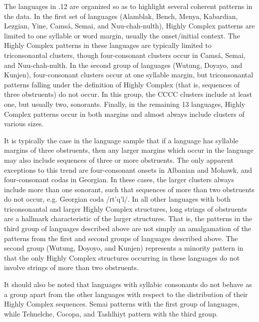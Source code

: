   The languages in .12 are organized so as to highlight several coherent patterns in the data. In the first set of languages (Alamblak, Bench, Menya, Kabardian, Lezgian, Yine, Camsá, Semai, and Nuu-chah-nulth), Highly Complex patterns are limited to one syllable or word margin, usually the onset/initial context. The Highly Complex patterns in these languages are typically limited to triconsonantal clusters, though four-consonant clusters occur in Camsá, Semai, and Nuu-chah-nulth. In the second group of languages (Wutung, Doyayo, and Kunjen), four-consonant clusters occur at one syllable margin, but triconsonantal patterns falling under the definition of Highly Complex (that is, sequences of three obstruents) do not occur. In this group, the CCCC clusters include at least one, but usually two, sonorants. Finally, in the remaining 13 languages, Highly Complex patterns occur in both margins and almost always include clusters of various sizes.



  It is typically the case in the language sample that if a language has syllable margins of three obstruents, then any larger margins which occur in the language may also include sequences of three or more obstruents. The only apparent exceptions to this trend are four-consonant onsets in Albanian and Mohawk, and four-consonant codas in Georgian. In these cases, the larger clusters always include more than one sonorant, such that sequences of more than two obstruents do not occur, e.g. Georgian coda /ɾt’q’l/. In all other languages with both triconsonantal and larger Highly Complex structures, long strings of obstruents are a hallmark characteristic of the larger structures. That is, the patterns in the third group of languages described above are not simply an amalgamation of the patterns from the first and second groups of languages described above. The second group (Wutung, Doyoyo, and Kunjen) represents a minority pattern in that the only Highly Complex structures occurring in these languages do not involve strings of more than two obstruents.



  It should also be noted that languages with syllabic consonants do not behave as a group apart from the other languages with respect to the distribution of their Highly Complex sequences. Semai patterns with the first group of languages, while Tehuelche, Cocopa, and Tashlhiyt pattern with the third group.



